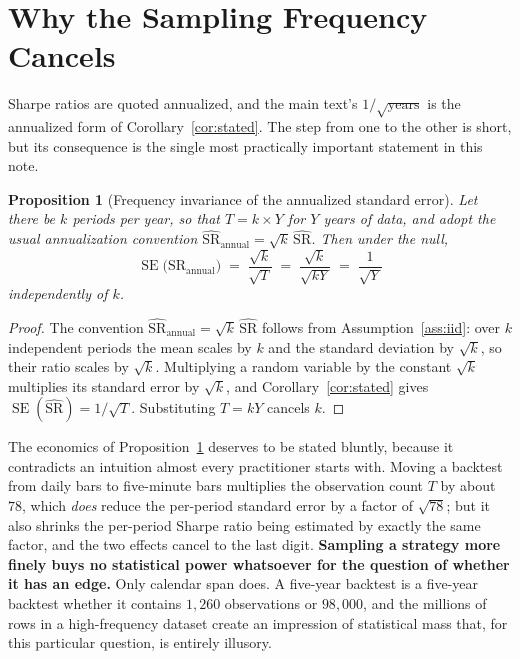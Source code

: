 \documentclass[11pt]{article}
\newtheorem{proposition}{Proposition}
\theoremstyle{remark}
\theoremstyle{definition}
\newcommand{\SRhat}{\widehat{\text{SR}}}
\begin{document}
\section{Why the Sampling Frequency Cancels}
\label{sec:annualize}

Sharpe ratios are quoted annualized, and the main text's $1/\sqrt{\text{years}}$ is the annualized form of Corollary~\ref{cor:stated}. The step from one to the other is short, but its consequence is the single most practically important statement in this note.

\begin{proposition}[Frequency invariance of the annualized standard error]
\label{prop:annual}
Let there be $k$ periods per year, so that $T = k \times Y$ for $Y$ years of data, and adopt the usual annualization convention $\SRhat_{\text{annual}} = \sqrt{k}\,\SRhat$. Then under the null,
\begin{equation}
\label{eq:annual}
\boxed{\;\operatorname{SE}\big(\SRhat_{\text{annual}}\big) \;=\; \frac{\sqrt{k}}{\sqrt{T}} \;=\; \frac{\sqrt{k}}{\sqrt{kY}} \;=\; \frac{1}{\sqrt{Y}}\;}
\end{equation}
independently of $k$.
\end{proposition}

\begin{proof}
The convention $\SRhat_{\text{annual}} = \sqrt{k}\,\SRhat$ follows from Assumption~\ref{ass:iid}: over $k$ independent periods the mean scales by $k$ and the standard deviation by $\sqrt{k}$, so their ratio scales by $\sqrt{k}$. Multiplying a random variable by the constant $\sqrt{k}$ multiplies its standard error by $\sqrt{k}$, and Corollary~\ref{cor:stated} gives $\operatorname{SE}(\SRhat) = 1/\sqrt{T}$. Substituting $T=kY$ cancels $k$.
\end{proof}

The economics of Proposition~\ref{prop:annual} deserves to be stated bluntly, because it contradicts an intuition almost every practitioner starts with. Moving a backtest from daily bars to five-minute bars multiplies the observation count $T$ by about $78$, which \emph{does} reduce the per-period standard error by a factor of $\sqrt{78}$; but it also shrinks the per-period Sharpe ratio being estimated by exactly the same factor, and the two effects cancel to the last digit. \textbf{Sampling a strategy more finely buys no statistical power whatsoever for the question of whether it has an edge.} Only calendar span does. A five-year backtest is a five-year backtest whether it contains $1{,}260$ observations or $98{,}000$, and the millions of rows in a high-frequency dataset create an impression of statistical mass that, for this particular question, is entirely illusory.
\end{document}
